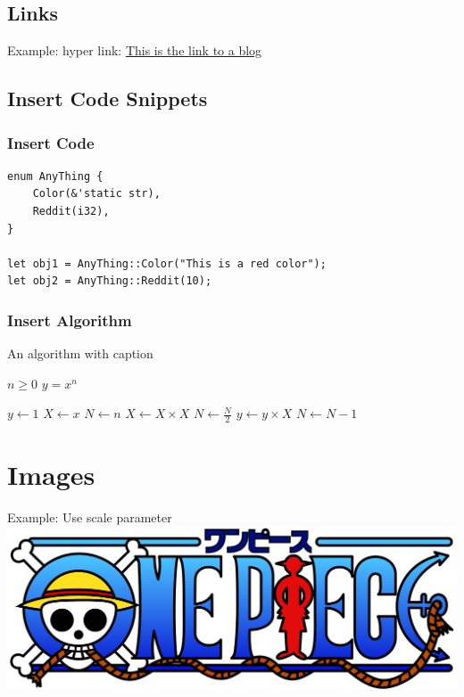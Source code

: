 \documentclass[letterpaper, oneside]{book}
\begin{document}
	
	\section{Links}
	
	Example: hyper link:  \href{https://news.ycombinator.com/news}{This is the link to a blog}
	
\section{Insert Code Snippets}
	
\subsection{Insert Code}

\begin{lstlisting}
enum AnyThing {
	Color(&'static str),
	Reddit(i32),
}

let obj1 = AnyThing::Color("This is a red color");
let obj2 = AnyThing::Reddit(10);
\end{lstlisting}

\subsection{Insert Algorithm}

\begin{algorithm}
	\caption{An algorithm with caption}\label{alg:cap}

	\begin{algorithmic}[1]
		\Require $n \geq 0$
		\Ensure $y = x^n$
	
		\State $y \gets 1$
		\State $X \gets x$
		\State $N \gets n$
		\State $X \gets X \times X$
		\State $N \gets \frac{N}{2}$  
		\State $y \gets y \times X$
		\State $N \gets N - 1$
		\EndIf
		\EndWhile

	
	\end{algorithmic}
\end{algorithm}

	
	
	\chapter{Images}
	Example: Use scale parameter \\
	\includegraphics[scale=0.6]{One_Piece_Logo.png}  
\end{document}
